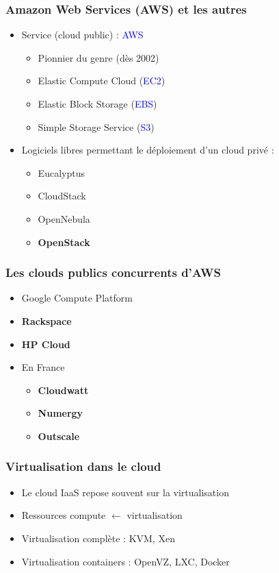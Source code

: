   \begin{frame}
    \frametitle{Amazon Web Services (AWS) et les autres}
    \begin{itemize}
      \item Service (cloud public) : \textcolor{blue}{AWS}
      \begin{itemize}
        \item Pionnier du genre (dès 2002)\pause
        \item Elastic Compute Cloud (\textcolor{blue}{EC2})
        \item Elastic Block Storage (\textcolor{blue}{EBS})\pause
        \item Simple Storage Service (\textcolor{blue}{S3})\pause
      \end{itemize}
        \item Logiciels libres permettant le déploiement d'un cloud privé :
      \begin{itemize}
        \item Eucalyptus
        \item CloudStack
        \item OpenNebula\pause
        \item \textbf{OpenStack}
      \end{itemize}
    \end{itemize}
  \end{frame}

  \begin{frame}
    \frametitle{Les clouds publics concurrents d'AWS}
    \begin{itemize}
      \item Google Compute Platform
      \item \textbf<3->{Rackspace}
      \item \textbf<3->{HP Cloud}\pause
      \item En France
      \begin{itemize}
        \item \textbf<3->{Cloudwatt}
        \item \textbf<3->{Numergy}
        \item \textbf<3->{Outscale}
      \end{itemize}
    \end{itemize}
  \end{frame}

  \begin{frame}
    \frametitle{Virtualisation dans le cloud}
    \begin{itemize}
      \item Le cloud IaaS repose souvent sur la virtualisation
      \item Ressources compute $\leftarrow$ virtualisation
      \item Virtualisation complète : KVM, Xen
      \item Virtualisation containers : OpenVZ, LXC, Docker
    \end{itemize}
  \end{frame}

